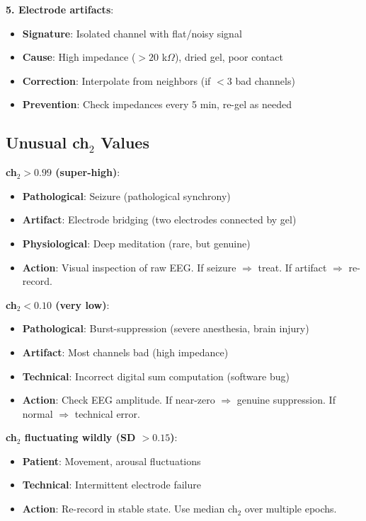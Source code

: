 \begin{theorem}
\textbf{5. Electrode artifacts}:
\begin{itemize}
\item \textbf{Signature}: Isolated channel with flat/noisy signal
\item \textbf{Cause}: High impedance ($> 20$ k$\Omega$), dried gel, poor contact
\item \textbf{Correction}: Interpolate from neighbors (if $< 3$ bad channels)
\item \textbf{Prevention}: Check impedances every 5 min, re-gel as needed
\end{itemize}
\end{theorem}

\subsection{Unusual ch$_2$ Values}

\begin{protocol}\label{prot:outliers}
\textbf{ch$_2 > 0.99$ (super-high)}:
\begin{itemize}
\item \textbf{Pathological}: Seizure (pathological synchrony)
\item \textbf{Artifact}: Electrode bridging (two electrodes connected by gel)
\item \textbf{Physiological}: Deep meditation (rare, but genuine)
\item \textbf{Action}: Visual inspection of raw EEG. If seizure $\Rightarrow$ treat. If artifact $\Rightarrow$ re-record.
\end{itemize}

\textbf{ch$_2 < 0.10$ (very low)}:
\begin{itemize}
\item \textbf{Pathological}: Burst-suppression (severe anesthesia, brain injury)
\item \textbf{Artifact}: Most channels bad (high impedance)
\item \textbf{Technical}: Incorrect digital sum computation (software bug)
\item \textbf{Action}: Check EEG amplitude. If near-zero $\Rightarrow$ genuine suppression. If normal $\Rightarrow$ technical error.
\end{itemize}

\textbf{ch$_2$ fluctuating wildly (SD $> 0.15$)}:
\begin{itemize}
\item \textbf{Patient}: Movement, arousal fluctuations
\item \textbf{Technical}: Intermittent electrode failure
\item \textbf{Action}: Re-record in stable state. Use median ch$_2$ over multiple epochs.
\end{itemize}
\end{protocol}

